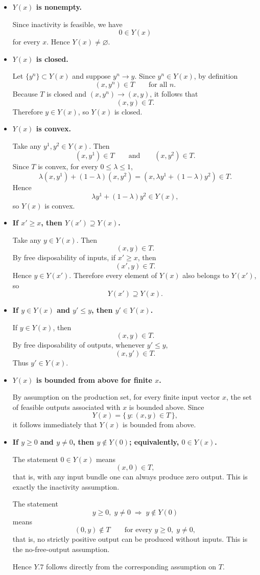 \begin{itemize}
\item[(Y.1)] \textbf{\(Y(x)\) is nonempty.}

Since inactivity is feasible, we have
\[
0 \in Y(x)
\]
for every \(x\). Hence \(Y(x)\neq \varnothing\).

\item[(Y.2)] \textbf{\(Y(x)\) is closed.}

Let \(\{y^n\}\subset Y(x)\) and suppose \(y^n \to y\).  
Since \(y^n\in Y(x)\), by definition
\[
(x,y^n)\in T \qquad \text{for all } n.
\]
Because \(T\) is closed and \((x,y^n)\to (x,y)\), it follows that
\[
(x,y)\in T.
\]
Therefore \(y\in Y(x)\), so \(Y(x)\) is closed.

\item[(Y.3)] \textbf{\(Y(x)\) is convex.}

Take any \(y^1,y^2\in Y(x)\). Then
\[
(x,y^1)\in T
\qquad \text{and} \qquad
(x,y^2)\in T.
\]
Since \(T\) is convex, for every \(0\le \lambda \le 1\),
\[
\lambda (x,y^1)+(1-\lambda)(x,y^2)
=
(x,\lambda y^1+(1-\lambda)y^2)\in T.
\]
Hence
\[
\lambda y^1+(1-\lambda)y^2\in Y(x),
\]
so \(Y(x)\) is convex.

\item[(Y.4)] \textbf{If \(x'\ge x\), then \(Y(x')\supseteq Y(x)\).}

Take any \(y\in Y(x)\). Then
\[
(x,y)\in T.
\]
By free disposability of inputs, if \(x'\ge x\), then
\[
(x',y)\in T.
\]
Hence \(y\in Y(x')\). Therefore every element of \(Y(x)\) also belongs to \(Y(x')\), so
\[
Y(x')\supseteq Y(x).
\]

\item[(Y.5)] \textbf{If \(y\in Y(x)\) and \(y'\le y\), then \(y'\in Y(x)\).}

If \(y\in Y(x)\), then
\[
(x,y)\in T.
\]
By free disposability of outputs, whenever \(y'\le y\),
\[
(x,y')\in T.
\]
Thus \(y'\in Y(x)\).

\item[(Y.6)] \textbf{\(Y(x)\) is bounded from above for finite \(x\).}

By assumption on the production set, for every finite input vector \(x\), the set of feasible outputs associated with \(x\) is bounded above. Since
\[
Y(x)=\{\,y:(x,y)\in T\,\},
\]
it follows immediately that \(Y(x)\) is bounded from above.

\item[(Y.7)] \textbf{If \(y\ge 0\) and \(y\neq 0\), then \(y\notin Y(0)\); equivalently, \(0\in Y(x)\).}

The statement \(0\in Y(x)\) means
\[
(x,0)\in T,
\]
that is, with any input bundle one can always produce zero output. This is exactly the inactivity assumption.

The statement
\[
y\ge 0,\; y\neq 0 \;\Rightarrow\; y\notin Y(0)
\]
means
\[
(0,y)\notin T \qquad \text{for every } y\ge 0,\; y\neq 0,
\]
that is, no strictly positive output can be produced without inputs. This is the no-free-output assumption.

Hence \(Y.7\) follows directly from the corresponding assumption on \(T\).
\end{itemize}

